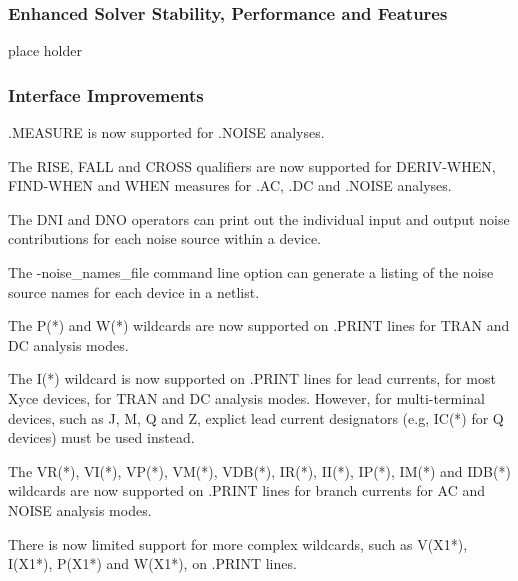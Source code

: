 \documentclass[letterpaper]{scrartcl}
\begin{document}
\subsubsection*{Enhanced Solver Stability, Performance and Features}
\begin{XyceItemize}
  \item place holder
\end{XyceItemize}

\subsubsection*{Interface Improvements}
\begin{XyceItemize}
  \item .MEASURE is now supported for .NOISE analyses.
  \item The RISE, FALL and CROSS qualifiers are now supported for
    DERIV-WHEN, FIND-WHEN and WHEN measures for .AC, .DC and .NOISE analyses.
  \item The DNI and DNO operators can print out the individual input and
    output noise contributions for each noise source within a device.
  \item The -noise\_names\_file command line option can generate a
    listing of the noise source names for each device in a netlist.
  \item The P(*) and W(*) wildcards are now supported on .PRINT lines
    for TRAN and DC analysis modes.
  \item The I(*) wildcard is now supported on .PRINT lines for lead
    currents, for most Xyce devices, for TRAN and DC analysis modes.
    However, for multi-terminal devices, such as J, M, Q and Z,
    explict lead current designators (e.g, IC(*) for Q devices) must
    be used instead.
  \item The VR(*), VI(*), VP(*), VM(*), VDB(*), IR(*), II(*), IP(*),
    IM(*) and IDB(*) wildcards are now supported on .PRINT lines
    for branch currents for AC and NOISE analysis modes.
  \item There is now limited support for more complex wildcards,
    such as V(X1*), I(X1*), P(X1*) and W(X1*), on .PRINT lines.
\end{XyceItemize}
\end{document}
